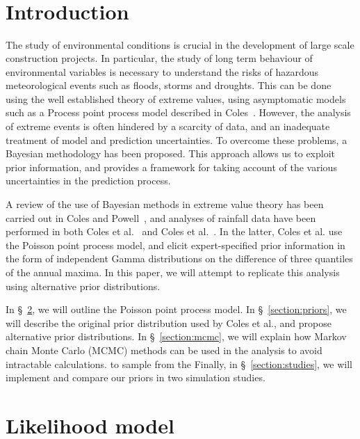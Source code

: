\documentclass{article}
\title{%
	\vspace{-15mm}\Huge{\hwtitle}\\
	\Large\vspace{1mm}\hwname\\
	\Large\vspace{1mm}\small{\itshape\hwdate}\vspace{-15mm}}
\date{}
\author{}
\begin{document}
%	
\maketitle
%
\section{Introduction}
%

%
The study of environmental conditions is crucial
in the development of large scale construction projects.
In particular, the study of long term behaviour
of environmental variables is necessary to understand
the risks of hazardous meteorological events such as
floods, storms and droughts.
This can be done using the well established theory of extreme values,
using asymptomatic models such as a Process point process model
described in Coles~\cite{coles2001}.
However, the analysis of extreme events is often hindered
by a scarcity of data, and an inadequate treatment
of model and prediction uncertainties.
To overcome these problems, a Bayesian methodology has been proposed.
This approach allows us to exploit prior information,
and provides a framework for taking account of the various uncertainties
in the prediction process.
%

%
A review of the use of Bayesian methods in extreme value theory
has been carried out in Coles and Powell~\cite{coles1996review},
and analyses of rainfall data have been performed
in both Coles et al.~\cite{coles2003} and Coles et al.~\cite{coles1996}.
In the latter, Coles et al. use the Poisson point process model,
and elicit expert-specified prior information
in the form of independent Gamma distributions
on the difference of three quantiles of the annual maxima.
In this paper, we will attempt to replicate this analysis using alternative prior distributions.
%

%
In \S~\ref{section:model}, we will outline the Poisson point process model.
In \S~\ref{section:priors}, we will describe the original prior distribution
used by Coles et al., and propose alternative prior distributions.
In \S~\ref{section:mcmc}, we will explain how Markov chain Monte Carlo (MCMC)
methods can be used in the analysis to avoid intractable calculations.
to sample from the
Finally, in \S~\ref{section:studies}, we will implement and compare our priors
in two simulation studies.
%
\section{Likelihood model}
\label{section:model}
%
\end{document}

